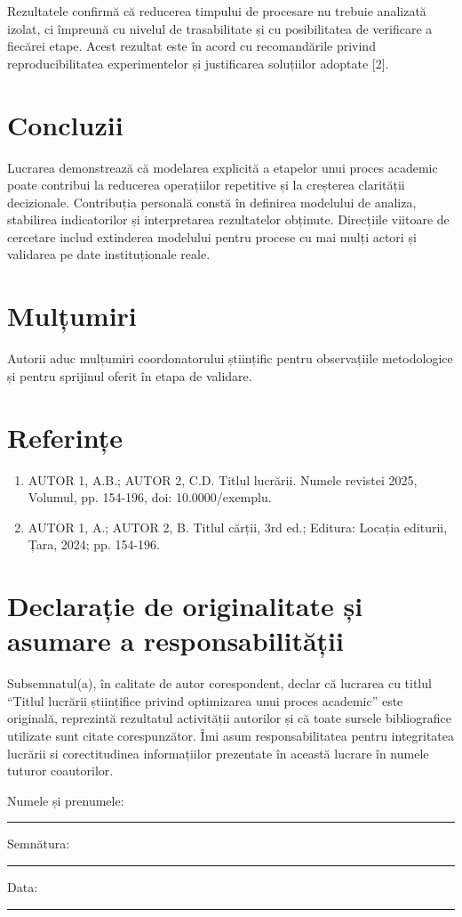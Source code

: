 \documentclass{utmconf}
\begin{document}
Rezultatele confirmă că reducerea timpului de procesare nu trebuie analizată izolat, ci împreună cu nivelul de trasabilitate și cu posibilitatea de verificare a fiecărei etape. Acest rezultat este în acord cu recomandările privind reproducibilitatea experimentelor și justificarea soluțiilor adoptate [2].

\section*{Concluzii}

Lucrarea demonstrează că modelarea explicită a etapelor unui proces academic poate contribui la reducerea operațiilor repetitive și la creșterea clarității decizionale. Contribuția personală constă în definirea modelului de analiza, stabilirea indicatorilor și interpretarea rezultatelor obținute. Direcțiile viitoare de cercetare includ extinderea modelului pentru procese cu mai mulți actori și validarea pe date instituționale reale.

\section*{Mulțumiri}

Autorii aduc mulțumiri coordonatorului științific pentru observațiile metodologice și pentru sprijinul oferit în etapa de validare.

\section*{Referințe}

\begin{enumerate}
\item AUTOR 1, A.B.; AUTOR 2, C.D. Titlul lucrării. Numele revistei 2025, Volumul, pp. 154-196, doi: 10.0000/exemplu.
\item AUTOR 1, A.; AUTOR 2, B. Titlul cărții, 3rd ed.; Editura: Locația editurii, Țara, 2024; pp. 154-196.
\end{enumerate}

\clearpage
\section*{Declarație de originalitate și asumare a responsabilității}

Subsemnatul(a), în calitate de autor corespondent, declar că lucrarea cu titlul ``Titlul lucrării științifice privind optimizarea unui proces academic'' este originală, reprezintă rezultatul activității autorilor și că toate sursele bibliografice utilizate sunt citate corespunzător. Îmi asum responsabilitatea pentru integritatea lucrării si corectitudinea informațiilor prezentate în această lucrare în numele tuturor coautorilor.

\vspace{1cm}
\noindent Numele și prenumele: \rule{7cm}{0.4pt}

\vspace{0.5cm}
\noindent Semnătura: \rule{7cm}{0.4pt}

\vspace{0.5cm}
\noindent Data: \rule{7cm}{0.4pt}
\end{document}
